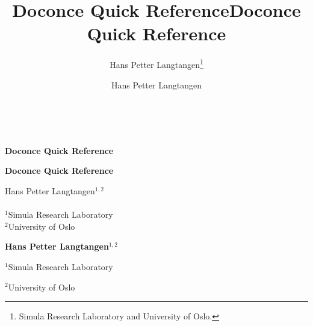 \documentclass[%
oneside,                 %
final,                   %
chapterprefix=true,      %
open=right               %
10pt]{book}
\begin{document}





\title{Doconce Quick Reference}


\thispagestyle{empty}
\hbox{\ \ }
\vfill
\begin{center}
{\huge{\bfseries{Doconce Quick Reference}}}


\title*{Doconce Quick Reference}


\begin{center}
{\LARGE\bf Doconce Quick Reference}
\end{center}




\author{Hans Petter Langtangen\footnote{Simula Research Laboratory and University of Oslo.}}

\vspace{1.3cm}

    {\Large\textsf{Hans Petter Langtangen${}^{1, 2}$}}\\ [3mm]
    
\ \\ [2mm]

{\large\textsf{${}^1$Simula Research Laboratory} \\ [1.5mm]}
{\large\textsf{${}^2$University of Oslo} \\ [1.5mm]}

\author{Hans Petter Langtangen}


\begin{center}
{\bf Hans Petter Langtangen${}^{1, 2}$} \\ [0mm]
\end{center}

\begin{center}
\centerline{{\small ${}^1$Simula Research Laboratory}}
\centerline{{\small ${}^2$University of Oslo}}
\end{center}




\end{center}
\end{document}
